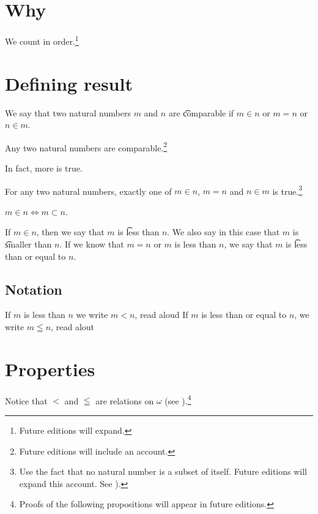 

\section*{Why}

We count in order.\footnote{Future editions will expand.}

\section*{Defining result}

We say that two natural numbers $m$ and $n$ are \t{comparable} if $m \in n$ or $m = n$ or $n \in m$.

\begin{proposition}
Any two natural numbers are comparable.\footnote{Future editions will include an account.}\end{proposition}
In fact, more is true.

\begin{proposition}
For any two natural numbers, exactly one of $m \in n$, $m = n$ and $n \in m$ is true.\footnote{Use the fact that no natural number is a subset of itself. Future editions will expand this account. See ).}\end{proposition}
\begin{proposition}
$m \in n \iff m \subset n$.\end{proposition}
If $m \in n$, then we say that $m$ is \t{less than} $n$.
We also say in this case that $m$ is \t{smaller than} $n$.
If we know that $m = n$ or $m$ is less than $n$, we say that $m$ is \t{less than or equal to} $n$.

\subsection*{Notation}

If $m$ is less than $n$ we write $m < n$, read aloud 
If $m$ is less than or equal to $n$, we write $m \leqq n$, read alout 

\section*{Properties}

Notice that $<$ and $\leqq$ are relations on $\omega $ (see ).\footnote{Proofs of the following propositions will appear in future editions.}

